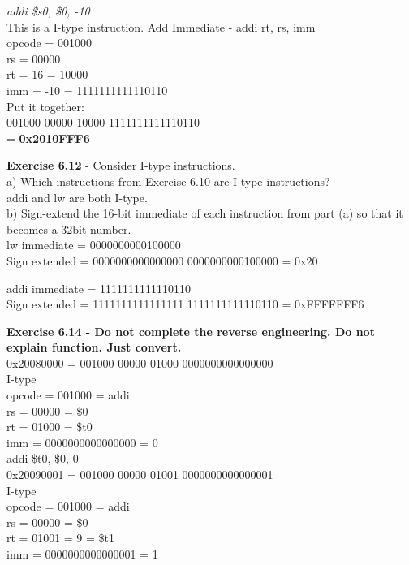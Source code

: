 \documentclass[12pt,a4paper]{report}
\begin{document}
\begin{normalsize}
\textit{addi \$s0, \$0, -10} \\
This is a I-type instruction. Add Immediate - addi rt, rs, imm \\

opcode = 001000 \\
rs = 00000 \\
rt = 16 = 10000 \\
imm = -10 = 1111111111110110 \\

Put it together: \\
001000 00000 10000 1111111111110110 \\
= \textbf{0x2010FFF6} \\

\medskip

\textbf{Exercise 6.12} - Consider I-type instructions. \\
a) Which instructions from Exercise 6.10 are I-type instructions? \\
addi and lw are both I-type. \\

b) Sign-extend the 16-bit immediate of each instruction from part (a) so that it becomes a 32bit number. \\
lw immediate = 0000000000100000 \\
Sign extended = 0000000000000000 0000000000100000 = 0x20

addi immediate = 1111111111110110 \\
Sign extended = 1111111111111111 1111111111110110 = 0xFFFFFFF6



\medskip

\textbf{Exercise 6.14 - Do not complete the reverse engineering. Do not explain function. Just convert.} \\

0x20080000 = 001000 00000 01000 0000000000000000 \\
I-type \\
opcode = 001000 = addi \\
rs = 00000 = \$0 \\
rt = 01000 = \$t0 \\
imm = 0000000000000000 = 0 \\

addi \$t0, \$0, 0 \\

0x20090001 = 001000 00000 01001 0000000000000001 \\
I-type \\
opcode = 001000 = addi \\
rs = 00000 = \$0 \\
rt = 01001 = 9 = \$t1 \\
imm = 0000000000000001 = 1\\


\end{normalsize}
\end{document}
